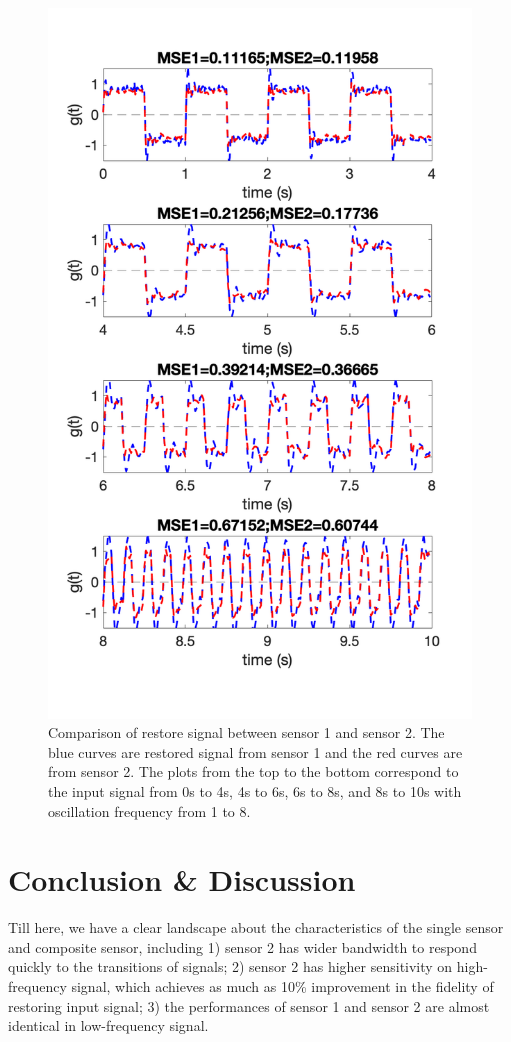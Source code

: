 \documentclass[12pt,a4paper,twocolumn]{article}
\begin{document}
\begin{figure}[!ht]
    \includegraphics[width=\columnwidth]{lab2_mse.png}
    \caption{Comparison of restore signal between sensor 1 and sensor 2. The blue curves are restored signal from sensor 1 and the red curves are from sensor 2. The plots from the top to the bottom correspond to the input signal from 0s to 4s, 4s to 6s, 6s to 8s, and 8s to 10s with oscillation frequency from 1 to 8.}
    \label{fig:5}
\end{figure}

\section{Conclusion \& Discussion}
Till here, we have a clear landscape about the characteristics of the single sensor and composite sensor, including 1) sensor 2 has wider bandwidth to respond quickly to the transitions of signals; 2) sensor 2 has higher sensitivity on high-frequency signal, which achieves as much as 10\% improvement in the fidelity of restoring input signal; 3) the performances of sensor 1 and sensor 2 are almost identical in low-frequency signal. 
\end{document}
